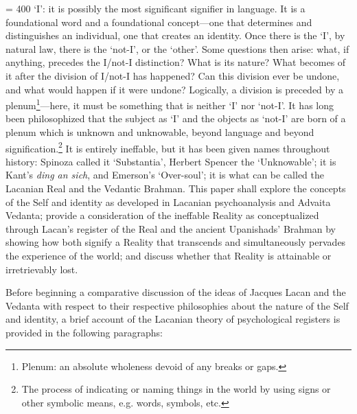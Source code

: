 \pretolerance = 400
\noindent `I': it is possibly the most significant signifier in language. It is a
foundational word and a foundational concept---one that determines and
distinguishes an individual, one that creates an identity. Once there is
the `I', by natural law, there is the `not-I', or the `other'. Some
questions then arise: what, if anything, precedes the I/not-I
distinction? What is its nature? What becomes of it after the division
of I/not-I has happened? Can this division ever be undone, and what
would happen if it were undone? Logically, a division is preceded by a
plenum\footnote{Plenum: an absolute wholeness devoid of any breaks or
  gaps.}---here, it must be something that is neither `I' nor `not-I'.
It has long been philosophized that the subject as `I' and the objects
as `not-I' are born of a plenum which is unknown and unknowable, beyond
language and beyond signification.\footnote{The process of indicating or
  naming things in the world by using signs or other symbolic means,
  e.g. words, symbols, etc.} It is entirely ineffable, but it has been
given names throughout history: Spinoza called it `Substantia', Herbert
Spencer the `Unknowable'; it is Kant's \emph{ding an sich}, and
Emerson's `Over-soul'; it is what can be called the Lacanian Real and
the Vedantic Brahman. This paper shall explore the concepts of the Self
and identity as developed in Lacanian psychoanalysis and Advaita
Vedanta; provide a consideration of the ineffable Reality as
conceptualized through Lacan's register of the Real and the ancient
Upanishads' Brahman by showing how both signify a Reality that
transcends and simultaneously pervades the experience of the world; and
discuss whether that Reality is attainable or irretrievably lost.

Before beginning a comparative discussion of the ideas of Jacques Lacan
and the Vedanta with respect to their respective philosophies about the
nature of the Self and identity, a brief account of the Lacanian theory
of psychological registers is provided in the following paragraphs:

